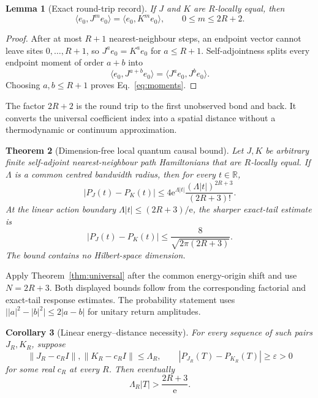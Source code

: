 \documentclass[10pt]{article}
\numberwithin{equation}{section}
\newtheorem{theorem}{Theorem}[section]
\newtheorem{corollary}[theorem]{Corollary}
\newtheorem{lemma}[theorem]{Lemma}
\theoremstyle{definition}
\theoremstyle{remark}
\newcommand{\R}{\mathbb R}
\newcommand{\ee}{\mathrm e}
\newcommand{\ip}[2]{\langle #1,#2\rangle}
\newcommand{\norm}[1]{\lVert #1\rVert}
\begin{document}
\begin{lemma}[Exact round-trip record]
\label{lem:roundtrip}
If \(J\) and \(K\) are \(R\)-locally equal, then
\begin{equation}
 \ip{e_0}{J^m e_0}=\ip{e_0}{K^m e_0},
 \qquad 0\le m\le2R+2.
\label{eq:moments}
\end{equation}
\end{lemma}

\begin{proof}
After at most \(R+1\) nearest-neighbour steps, an endpoint vector cannot
leave sites \(0,\ldots,R+1\), so
\(J^a e_0=K^a e_0\) for \(a\le R+1\).
Self-adjointness splits every endpoint moment of order \(a+b\) into
\[
 \ip{e_0}{J^{a+b}e_0}
 =\ip{J^a e_0}{J^b e_0}.
\]
Choosing \(a,b\le R+1\) proves Eq.~\eqref{eq:moments}.
\end{proof}

The factor \(2R+2\) is the round trip to the first unobserved bond and back.
It converts the universal coefficient index into a spatial distance without
a thermodynamic or continuum approximation.

\begin{theorem}[Dimension-free local quantum causal bound]
\label{thm:local-bound}
Let \(J,K\) be arbitrary finite self-adjoint nearest-neighbour path
Hamiltonians that are \(R\)-locally equal.  If \(\Lambda\) is a common
centred bandwidth radius, then for every \(t\in\R\),
\begin{equation}
 |P_J(t)-P_K(t)|
 \le
 4\ee^{\Lambda|t|}
 \frac{(\Lambda|t|)^{2R+3}}{(2R+3)!}.
\label{eq:prob-bound}
\end{equation}
At the linear action boundary
\(\Lambda|t|\le(2R+3)/\ee\), the sharper exact-tail estimate is
\begin{equation}
 |P_J(t)-P_K(t)|
 \le
 \frac{8}{\sqrt{2\pi(2R+3)}}.
\label{eq:prob-critical}
\end{equation}
The bound contains no Hilbert-space dimension.
\end{theorem}

Apply Theorem~\ref{thm:universal} after the common energy-origin shift and
use \(N=2R+3\).  Both displayed bounds follow from the corresponding
factorial and exact-tail response estimates.  The probability statement uses
\(\big||a|^2-|b|^2\big|\le2|a-b|\) for unitary return amplitudes.

\begin{corollary}[Linear energy--distance necessity]
\label{cor:necessity}
For every sequence of such pairs \(J_R,K_R\), suppose
\[
 \norm{J_R-c_RI},\norm{K_R-c_RI}\le\Lambda_R,\qquad
 |P_{J_R}(T)-P_{K_R}(T)|\ge\varepsilon>0
\]
for some real \(c_R\) at every \(R\).  Then eventually
\begin{equation}
 \Lambda_R|T|>\frac{2R+3}{\ee}.
\label{eq:necessity}
\end{equation}
\end{corollary}
\end{document}
